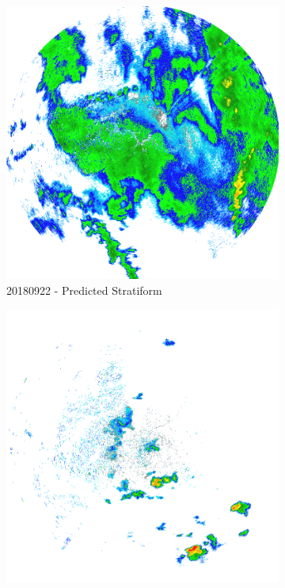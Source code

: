 \begin{figure}[ht]
\begin{subfigure}[b]{0.45\textwidth}
		\includegraphics[width=\textwidth]{./thesis_code/plots/midlothian-tx-20180922-105742-ref.png}
		\caption{20180922 - Predicted Stratiform}
		\label{fig:classifying_datadiscovery_ex7}
	\end{subfigure}
	\begin{subfigure}[b]{0.45\textwidth}
		\includegraphics[width=\textwidth]{./thesis_code/plots/midlothian-tx-20180929-202320-ref.png}

\end{subfigure}
\end{figure}
